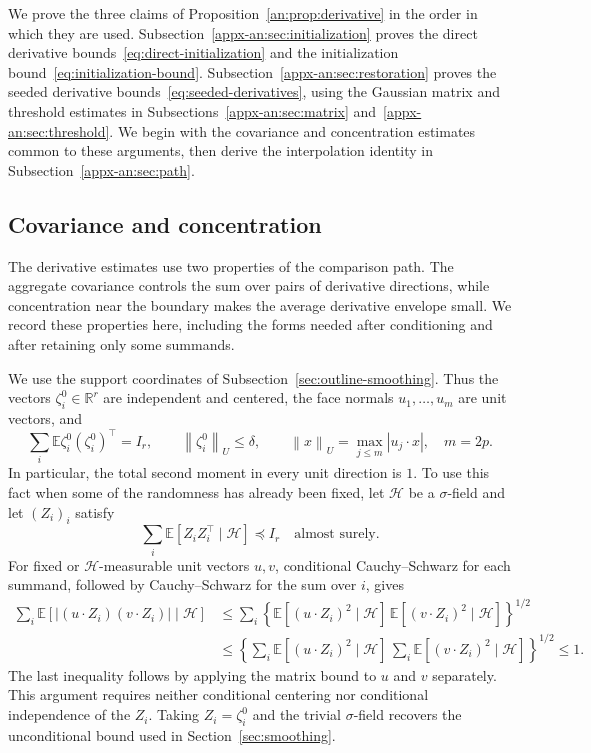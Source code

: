 \documentclass[11pt,letterpaper,twoside,leqno]{article}
\theoremstyle{bookplain}
\theoremstyle{bookremark}
\newcommand{\E}{\mathbb E}
\newcommand{\R}{\mathbb R}
\newcommand{\norm}[1]{\left\lVert#1\right\rVert}
\begin{document}
We prove the three claims of Proposition~\ref{an:prop:derivative}
in the order in which they are used.
Subsection~\ref{appx-an:sec:initialization} proves the direct
derivative bounds~\eqref{eq:direct-initialization} and the
initialization bound~\eqref{eq:initialization-bound}.
Subsection~\ref{appx-an:sec:restoration} proves the seeded
derivative bounds~\eqref{eq:seeded-derivatives}, using the Gaussian
matrix and threshold estimates in
Subsections~\ref{appx-an:sec:matrix} and~\ref{appx-an:sec:threshold}.
We begin with the covariance and concentration estimates common
to these arguments, then derive the interpolation identity in
Subsection~\ref{appx-an:sec:path}.

\subsection{Covariance and concentration}
\label{appx-an:sec:coords}

The derivative estimates use two properties of the comparison path.
The aggregate covariance controls the sum over pairs of derivative
directions, while concentration near the boundary makes the average
derivative envelope small. We record these properties here, including
the forms needed after conditioning and after retaining only some
summands.

We use the support coordinates of
Subsection~\ref{sec:outline-smoothing}. Thus the vectors
\(\zeta_i^0\in\R^r\) are independent and centered, the face normals
\(u_1,\ldots,u_m\) are unit vectors, and
\begin{equation}
 \sum_i\E\zeta_i^0(\zeta_i^0)^\top=I_r,
 \qquad \norm{\zeta_i^0}_U\le\delta,
 \qquad \norm x_U=\max_{j\le m}|u_j\cdot x|,
 \quad m=2p.
 \label{appx-eq:projected-bound}
\end{equation}
In particular, the total second moment in every unit direction is
$1$. To use this fact when some of the randomness has already been
fixed, let \(\mathcal H\) be a \(\sigma\)-field and let \((Z_i)_i\)
satisfy
\[
 \sum_i\E[Z_iZ_i^\top\mid\mathcal H]\preceq I_r
 \quad\text{almost surely}.
\]
For fixed or \(\mathcal H\)-measurable unit vectors \(u,v\),
conditional Cauchy--Schwarz for each summand, followed by
Cauchy--Schwarz for the sum over \(i\), gives
\begin{equation}
 \begin{aligned}
 \sum_i\E[|(u\cdot Z_i)(v\cdot Z_i)|\mid\mathcal H]
 &\le\sum_i
   \left\{\E[(u\cdot Z_i)^2\mid\mathcal H]\,
          \E[(v\cdot Z_i)^2\mid\mathcal H]\right\}^{1/2}\\
 &\le\left\{\sum_i\E[(u\cdot Z_i)^2\mid\mathcal H]\,
             \sum_i\E[(v\cdot Z_i)^2\mid\mathcal H]\right\}^{1/2}
 \le1.
 \end{aligned}
 \label{appx-an:pair-contraction}
\end{equation}
The last inequality follows by applying the matrix bound to \(u\)
and \(v\) separately. This argument requires neither conditional
centering nor conditional independence of the \(Z_i\).
Taking \(Z_i=\zeta_i^0\) and the trivial \(\sigma\)-field recovers
the unconditional bound used in Section~\ref{sec:smoothing}.
\end{document}
